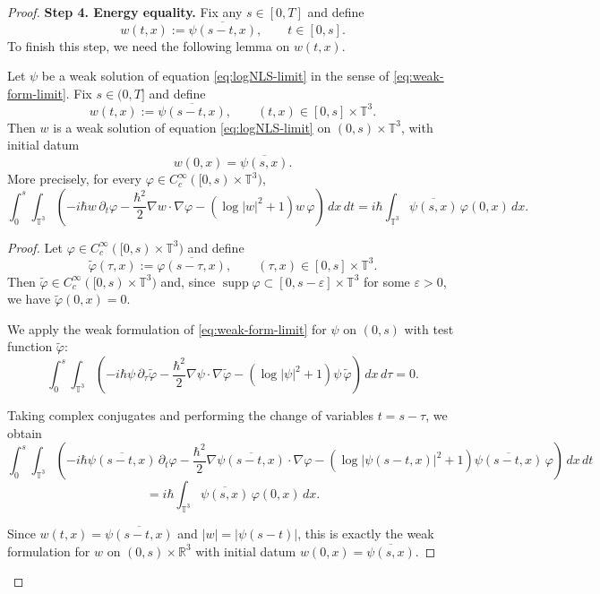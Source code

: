 \documentclass[10pt,a4paper]{amsart}
\begin{document}
\begin{proof}
\noindent
\textbf{Step 4. Energy equality.}
Fix any $s\in [0,T]$ and define
\[
w(t,x):=\overline{\psi(s-t,x)}, \qquad t\in [0,s].
\]
To finish this step, we need the following lemma on $w(t,x)$.
\begin{lemma}
\label{Time-reversal invariance}
Let $\psi$ be a weak solution of equation \eqref{eq:logNLS-limit}
in the sense of \eqref{eq:weak-form-limit}.  Fix $s\in (0,T]$ and define
\[
w(t,x):=\overline{\psi(s-t,x)}, \qquad (t,x)\in [0,s]\times \mathbb{T}^3.
\]
Then $w$ is a weak solution of  equation \eqref{eq:logNLS-limit}
 on $(0,s)\times \mathbb{T}^3$, with initial datum
\[
w(0,x)=\overline{\psi(s,x)}.
\]
More precisely, for every $\varphi\in C_c^\infty([0,s)\times \mathbb{T}^3)$,
\[
\int_0^s \int_{\mathbb{T}^3}
\left(
-i\hbar w\,\partial_t\varphi
-\frac{\hbar^2}{2}\nabla w\cdot \nabla \varphi
-(\log |w|^2+1)w\,\varphi
\right)\,dx\,dt
=
i\hbar \int_{\mathbb{T}^3} \overline{\psi(s,x)}\,\varphi(0,x)\,dx.
\]
\end{lemma}

\begin{proof}
Let $\varphi\in C_c^\infty([0,s)\times \mathbb{T}^3)$ and define
\[
\widetilde{\varphi}(\tau,x):=\overline{\varphi(s-\tau,x)},
\qquad (\tau,x)\in [0,s]\times \mathbb{T}^3.
\]
Then $\widetilde{\varphi}\in C_c^\infty([0,s)\times \mathbb{T}^3)$ and, since
$\operatorname{supp}\varphi \subset [0,s-\varepsilon]\times \mathbb{T}^3$ for some $\varepsilon>0$,
we have $\widetilde{\varphi}(0,x)=0$.

We apply the weak formulation of  \eqref{eq:weak-form-limit} for $\psi$ on $(0,s)$ with test function
$\widetilde{\varphi}$:
\[
\int_0^s \int_{\mathbb{T}^3}
\left(
-i\hbar \psi\,\partial_\tau \widetilde{\varphi}
-\frac{\hbar^2}{2}\nabla \psi\cdot \nabla \widetilde{\varphi}
-(\log |\psi|^2+1)\psi\,\widetilde{\varphi}
\right)\,dx\,d\tau
=0.
\]

Taking complex conjugates and performing the change of variables $t=s-\tau$, we obtain
\[
\int_0^s \int_{\mathbb{T}^3}
\left(
-i\hbar \overline{\psi(s-t,x)}\,\partial_t\varphi
-\frac{\hbar^2}{2}\nabla \overline{\psi(s-t,x)}\cdot \nabla \varphi
-(\log |\psi(s-t,x)|^2+1)\overline{\psi(s-t,x)}\,\varphi
\right)\,dx\,dt
\]
\[
=
i\hbar \int_{\mathbb{T}^3} \overline{\psi(s,x)}\,\varphi(0,x)\,dx.
\]

Since $w(t,x)=\overline{\psi(s-t,x)}$ and $|w|=|\psi(s-t)|$, this is exactly the weak formulation
for $w$ on $(0,s)\times \mathbb{R}^3$ with initial datum $w(0,x)=\overline{\psi(s,x)}$.
\end{proof}




\end{proof}
\end{document}
